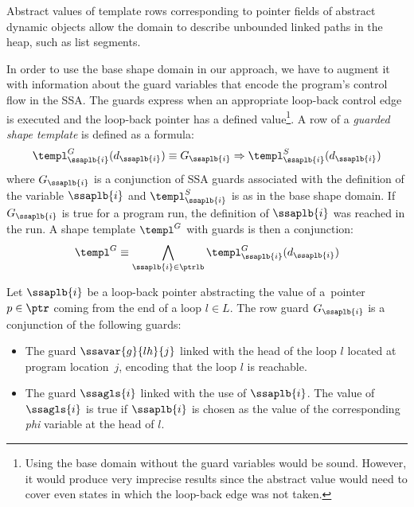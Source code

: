 {Abstract values of template rows corresponding to pointer fields of abstract
dynamic objects allow the domain to describe unbounded linked paths in the heap,
such as list segments.

In order to use the base shape domain in our approach, we have to augment it
with information about the guard variables that encode the program's control
flow in the SSA. The guards express when an appropriate loop-back control edge
is executed and the loop-back pointer has a defined value\footnote{Using the base domain without the guard variables would be sound. However, it
would produce very imprecise results since the abstract value would
need to cover even states in which the loop-back edge was not taken.}.
%
A row of a \emph{guarded shape template} is defined
as a formula:
\begin{equation}\label{eq:templ_row_guard}
\begin{split}
\templ^G_{\ssaplb{i}}(d_{\ssaplb{i}}) \equiv G_{\ssaplb{i}}
\Rightarrow \templ^S_{\ssaplb{i}}(d_{\ssaplb{i}})
\end{split}
\end{equation}
where $G_{\ssaplb{i}}$ is a conjunction of SSA guards associated with the definition of the variable
$\ssaplb{i}$ and $\templ^S_{\ssaplb{i}}$ is as in the base shape domain.
%
If $G_{\ssaplb{i}}$ is true for a program run, the definition of $\ssaplb{i}$
was reached in the run.
%
A shape template $\templ^G$ with guards is then a conjunction:
\begin{equation}\label{eq:templ_guard}
\begin{split}
\templ^G \equiv \bigwedge_{\ssaplb{i} \in \ptrlb}
\templ^G_{\ssaplb{i}}(d_{\ssaplb{i}})
\end{split}
\end{equation}

Let $\ssaplb{i}$ be a loop-back pointer abstracting the value of a~pointer $p
\in \ptr$ coming from the end of a loop $l \in L$. 
%
The row guard $G_{\ssaplb{i}}$ is a conjunction of the following guards:
\begin{itemize} 

  \item The guard $\ssavar{g}{lh}{j}$ linked with the head of the loop
    $l$ located at program location~$j$, encoding that the
    loop $l$ is reachable.

  \item The guard $\ssagls{i}$ linked with the use of $\ssaplb{i}$. The value of
  $\ssagls{i}$ is true if $\ssaplb{i}$ is chosen as the value of the
  corresponding \emph{phi} variable at the head of $l$.


\end{itemize}}
